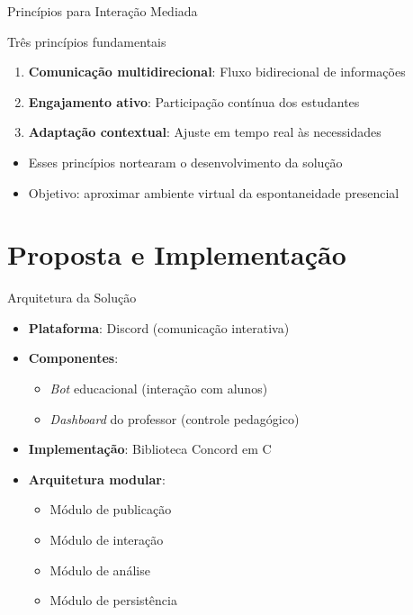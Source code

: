 \documentclass[aspectratio=169]{beamer}
\begin{document}
{\begin{frame}{Princípios para Interação Mediada}
  \begin{block}{Três princípios fundamentais}
  \begin{enumerate}
  \item \textbf{Comunicação multidirecional}: Fluxo bidirecional de informações
  \item \textbf{Engajamento ativo}: Participação contínua dos estudantes
  \item \textbf{Adaptação contextual}: Ajuste em tempo real às necessidades
  \end{enumerate}
  \end{block}
  
  \begin{itemize}
  \item Esses princípios nortearam o desenvolvimento da solução
  \item Objetivo: aproximar ambiente virtual da espontaneidade presencial
  \end{itemize}
\end{frame}

\section{Proposta e Implementação}

\begin{frame}{Arquitetura da Solução}
  \begin{itemize}
  \item \textbf{Plataforma}: Discord (comunicação interativa)
  \item \textbf{Componentes}:
    \begin{itemize}
    \item \textit{Bot} educacional (interação com alunos)
    \item \textit{Dashboard} do professor (controle pedagógico)
    \end{itemize}
  \item \textbf{Implementação}: Biblioteca Concord em C
  \item \textbf{Arquitetura modular}:
    \begin{itemize}
    \item Módulo de publicação
    \item Módulo de interação
    \item Módulo de análise
    \item Módulo de persistência
    \end{itemize}
  \end{itemize}
\end{frame}

}
\end{document}
